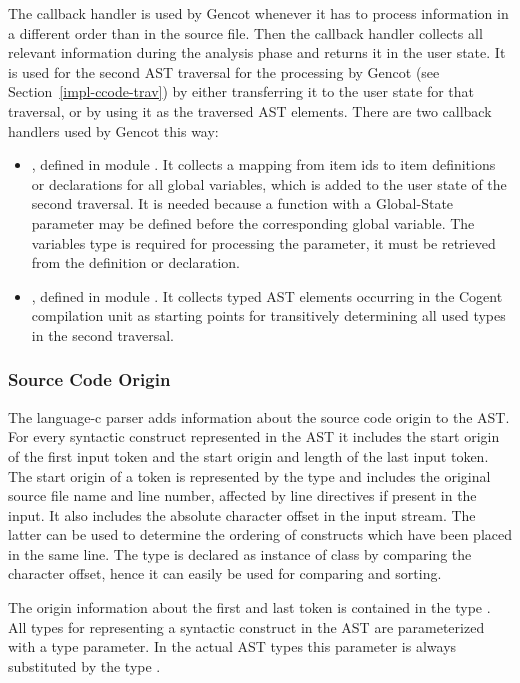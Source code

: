 The callback handler is used by Gencot whenever it has to process information in a different order than in the source file.
Then the callback handler collects all relevant information during the analysis phase and returns it in the user state.
It is used for the second AST traversal for the processing by Gencot (see Section~\ref{impl-ccode-trav}) by either
transferring it to the user state for that traversal, or by using it as the traversed AST elements.
There are two callback handlers used by Gencot this way:
\begin{itemize}
\item {}, defined in module . It collects a mapping from item ids to
item definitions or declarations for all global variables, which is added to the user state of the second traversal.
It is needed because a function with a Global-State parameter may be defined before the corresponding global variable.
The variables type is required for processing the parameter, it must be retrieved from the definition or declaration.
\item {}, defined in module . It collects typed AST elements occurring in the
Cogent compilation unit as starting points for transitively determining all used types in the second traversal.
\end{itemize}

\subsubsection{Source Code Origin}

The language-c parser adds information about the source code origin to the AST. For every syntactic construct represented
in the AST it includes the start origin of the first input token and the start origin and length of the last input token.
The start origin of a token is represented by the type  and includes the original source file name and 
line number, affected by line directives if present in the input. It also includes the absolute character offset in the 
input stream. The latter can be used to determine the ordering of constructs which have been placed in the same line.
The type  is declared as instance of class  by comparing the character offset, hence it can 
easily be used for comparing and sorting.

The origin information about the first and last token is contained in the type . All types for representing
a syntactic construct in the AST are parameterized with a type parameter. In the actual AST types this parameter is always 
substituted by the type . 

